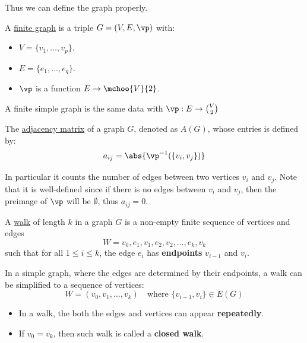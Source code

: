Thus we can define the graph properly.

\begin{definition}
	A \underline{finite graph} is a triple \( G=(V,E, \vp) \) with:
	\begin{itemize}
		\item \( V = \{v_1, \ldots, v_p\} \).
		\item \( E = \{e_1, \ldots, e_q\} \).
		\item \( \vp \) is a function \( E \to \mchoo{V}{2} \).
	\end{itemize}

	A finite simple graph is the same data with \( \vp: E \to \binom{V}{2} \)
\end{definition}

\begin{definition}
	The \underline{adjacency matrix} of a graph \( G \), denoted as \( A(G) \), whose entries is defined by:
	\[
		a_{ij} = \abs{\vp^{-1}(\{v_i, v_j\})}
	\]

	In particular it counts the number of edges between two vertices \( v_i \) and \( v_j \). Note that it is well-defined since if there is no edges between \( v_i \) and \( v_j \), then the preimage of \( \vp \) will be \( \emptyset \), thus \( a_{ij}=0 \).
\end{definition}

\begin{definition}
	A \underline{walk} of length $k$ in a graph $G$ is a non-empty finite sequence of vertices and edges
	\[
		W = v_0, e_1, v_1, e_2, v_2, \dots, e_k, v_k
	\]
	such that for all $1 \le i \le k$, the edge $e_i$ has \textbf{endpoints} $v_{i-1}$ and $v_i$.

	In a simple graph, where the edges are determined by their endpoints, a walk can be simplified to a sequence of vertices:
	\[
		W = (v_0, v_1, \dots, v_k) \quad \text{where } \{v_{i-1}, v_i\} \in E(G)
	\]
\end{definition}

\begin{note}
	\leavevmode
	\begin{itemize}
		\item In a walk, the both the edges and vertices can appear \textbf{repeatedly}.
		\item If \( v_0 = v_k \), then such walk is called a \textbf{closed walk}.
	\end{itemize}
\end{note}

